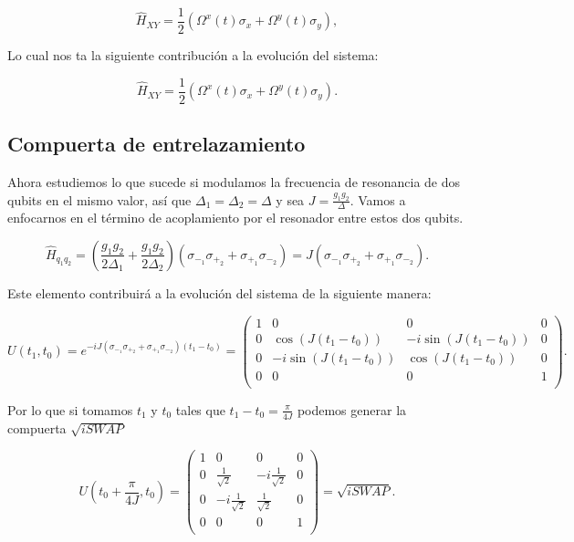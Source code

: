 \begin{equation}
    \hat{H}_{XY} = \frac{1}{2} (\Omega^x(t) \sigma_x + \Omega^y(t) \sigma_y) ,
\end{equation}

Lo cual nos ta la siguiente contribución a la evolución del sistema:

\begin{equation}
    \hat{H}_{XY} = \frac{1}{2} (\Omega^x(t) \sigma_x + \Omega^y(t) \sigma_y) .
\end{equation}

\subsection{Compuerta de entrelazamiento}

Ahora estudiemos lo que sucede si modulamos la frecuencia de resonancia de dos qubits en el mismo valor, así que $\Delta_1 = \Delta_2 = \Delta$ y sea $J = \frac{g_1 g_2}{\Delta}$. Vamos a enfocarnos en el término de acoplamiento por el resonador entre estos dos qubits.

\begin{equation}
    \hat{H}_{q_1 q_2} = (\frac{g_1 g_2}{2 \Delta_1} + \frac{g_1 g_2}{2 \Delta_2}) (\sigma_{-_1} \sigma_{+_2} + \sigma_{+_1} \sigma_{-_2}) = J (\sigma_{-_1} \sigma_{+_2} + \sigma_{+_1} \sigma_{-_2}) .
\end{equation}

Este elemento contribuirá a la evolución del sistema de la siguiente manera:

\begin{equation}
    U(t_1, t_0) = e^{-i J (\sigma_{-_1} \sigma_{+_2} + \sigma_{+_1} \sigma_{-_2}) (t_1 - t_0)} = 
    \begin{pmatrix}
        1 & 0 & 0 & 0 \\
        0 & \cos(J (t_1 - t_0))  & -i \sin(J (t_1 - t_0)) & 0 \\
        0 & -i \sin(J (t_1 - t_0)) & \cos(J (t_1 - t_0)) & 0 \\
        0 & 0 & 0 & 1 \\
    \end{pmatrix} .
\end{equation}

Por lo que si tomamos $t_1$ y $t_0$ tales que $t_1 - t_0 = \frac{\pi}{4J}$ podemos generar la compuerta $\sqrt{iSWAP}$

\begin{equation}
    U(t_0 + \frac{\pi}{4J}, t_0) = 
    \begin{pmatrix}
        1 & 0 & 0 & 0 \\
        0 & \frac{1}{\sqrt{2}}  & -i \frac{1}{\sqrt{2}} & 0 \\
        0 & -i \frac{1}{\sqrt{2}} & \frac{1}{\sqrt{2}} & 0 \\
        0 & 0 & 0 & 1 \\
    \end{pmatrix} = \sqrt{iSWAP} .
\end{equation}

